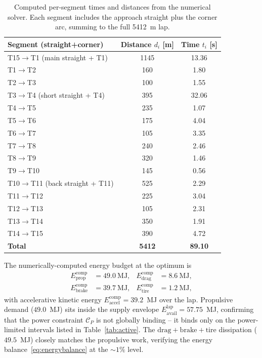 \documentclass[11pt,twocolumn]{article}
\theoremstyle{definition}
\theoremstyle{remark}
\begin{document}
\begin{table}[!t]
\centering
\caption{Computed per-segment times and distances from the numerical solver.
Each segment includes the approach straight plus the corner arc, summing to
the full 5412~m lap.}
\label{tab:comp-segments}
\begin{tabular}{lcc}
\toprule
Segment (straight+corner) & Distance $d_i$ [m] & Time $t_i$ [s]\\
\midrule
T15$\to$T1 (main straight + T1)          & 1145 & 13.36\\
T1$\to$T2                                 & 160  & 1.80\\
T2$\to$T3                                 & 100  & 1.55\\
T3$\to$T4 (short straight + T4)           & 395  & 32.06\\
T4$\to$T5                                 & 235  & 1.07\\
T5$\to$T6                                 & 175  & 4.04\\
T6$\to$T7                                 & 105  & 3.35\\
T7$\to$T8                                 & 240  & 2.46\\
T8$\to$T9                                 & 320  & 1.46\\
T9$\to$T10                                & 145  & 0.56\\
T10$\to$T11 (back straight + T11)         & 525  & 2.29\\
T11$\to$T12                               & 225  & 3.04\\
T12$\to$T13                               & 105  & 2.31\\
T13$\to$T14                               & 350  & 1.91\\
T14$\to$T15                               & 390  & 4.72\\
\midrule
\textbf{Total}                            & \textbf{5412} & \textbf{89.10}\\
\bottomrule
\end{tabular}
\end{table}

The numerically-computed energy budget at the optimum is
\begin{align*}
  E_{\mathrm{prop}}^{\mathrm{comp}} &= 49.0~\mathrm{MJ}, &
  E_{\mathrm{drag}}^{\mathrm{comp}} &= 8.6~\mathrm{MJ},\\
  E_{\mathrm{brake}}^{\mathrm{comp}} &= 39.7~\mathrm{MJ}, &
  E_{\mathrm{tire}}^{\mathrm{comp}} &= 1.2~\mathrm{MJ},
\end{align*}
with accelerative kinetic energy $E_{\mathrm{accel}}^{\mathrm{comp}} = 39.2$~MJ
over the lap. Propulsive demand ($49.0$~MJ) sits inside the supply envelope
$E_{\mathrm{avail}}^{\mathrm{lap}} = 57.75$~MJ, confirming that the power
constraint $\mathcal{C}_P$ is not globally binding -- it binds only on the
power-limited intervals listed in Table~\ref{tab:active}. The
$\mathrm{drag}+\mathrm{brake}+\mathrm{tire}$ dissipation
($49.5$~MJ) closely matches the propulsive work, verifying the energy
balance~\eqref{eq:energybalance} at the $\sim 1\%$ level.
\end{document}
